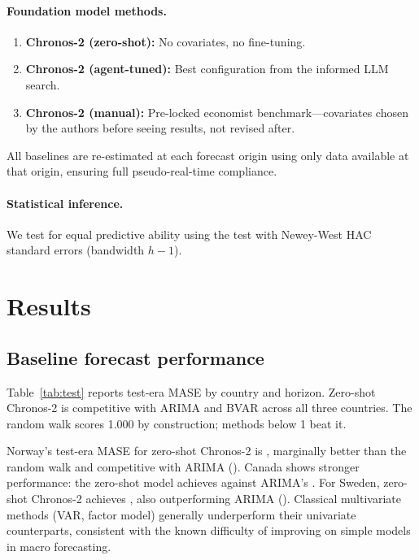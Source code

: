 \documentclass[12pt,a4paper]{article}
\begin{document}
\paragraph{Foundation model methods.}
\begin{enumerate}
    \item \textbf{Chronos-2 (zero-shot):} No covariates, no fine-tuning.
    \item \textbf{Chronos-2 (agent-tuned):} Best configuration from the informed LLM search.
    \item \textbf{Chronos-2 (manual):} Pre-locked economist benchmark---covariates chosen by the authors before seeing results, not revised after.
\end{enumerate}

All baselines are re-estimated at each forecast origin using only data available at that origin, ensuring full pseudo-real-time compliance.

\paragraph{Statistical inference.} We test for equal predictive ability using the \citet{diebold2002comparing} test with Newey-West HAC standard errors (bandwidth $h - 1$).


\section{Results}
\label{sec:results}

\subsection{Baseline forecast performance}
\label{sec:results_baselines}

Table~\ref{tab:test} reports test-era MASE by country and horizon. Zero-shot Chronos-2 is competitive with ARIMA and BVAR across all three countries. The random walk scores 1.000 by construction; methods below 1 beat it.

\begin{table}[H]
\centering
\caption{Test era MASE by country and method (average across targets)}
\label{tab:test}

\end{table}

Norway's test-era MASE for zero-shot Chronos-2 is \norZsTest, marginally better than the random walk and competitive with ARIMA (\norArimaTest). Canada shows stronger performance: the zero-shot model achieves \canZsTest{} against ARIMA's \canArimaTest. For Sweden, zero-shot Chronos-2 achieves \sweZsTest, also outperforming ARIMA (\sweArimaTest). Classical multivariate methods (VAR, factor model) generally underperform their univariate counterparts, consistent with the known difficulty of improving on simple models in macro forecasting.
\end{document}
